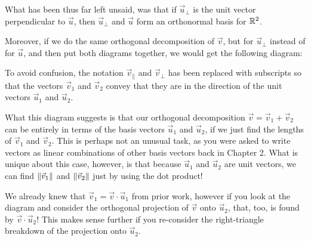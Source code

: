 \documentclass{ximera}
\begin{document}
What has been thus far left unsaid, was that if $\vec{u}_\perp$ is the unit vector perpendicular to $\vec{u}$, then $\vec{u}_\perp$ and $\vec{u}$ form an orthonormal basis for $\mathbb{R}^2$.

Moreover, if we do the same orthogonal decomposition of $\vec{v}$, but for $\vec{u}_\perp$ instead of for $\vec{u}$, and then put both diagrams together, we would get the following diagram:

\begin{center}
   
  \end{center}

  To avoid confusion, the notation $\vec{v}_\parallel$ and $\vec{v}_\perp$ has been replaced with subscripts so that the vectors $\vec{v}_1$ and $\vec{v}_2$ convey that they are in the direction of the unit vectors $\vec{u}_1$ and $\vec{u}_2$.

  What this diagram suggests is that our orthogonal decomposition $\vec{v}=\vec{v}_1+\vec{v}_2$ can be entirely in terms of the basis vectors $\vec{u}_1$ and $\vec{u}_2$, if we just find the lengths of $\vec{v}_1$ and $\vec{v}_2$. This is perhaps not an unusual task, as you were asked to write vectors as linear combinations of other basis vectors back in Chapter 2. What is unique about this case, however, is that because $\vec{u}_1$ and $\vec{u}_2$ are unit vectors, we can find $\left\|\vec{v}_1\right\|$ and $\left\|\vec{v}_2\right\|$ just by using the dot product!

  We already knew that $\vec{v}_1=\vec{v}\cdot\vec{u}_1$ from prior work, however if you look at the diagram and consider the orthogonal projection of $\vec{v}$ onto $\vec{u}_2$, that, too, is found by $\vec{v}\cdot\vec{u}_2$! This makes sense further if you re-consider the right-triangle breakdown of the projection onto $\vec{u}_2$.
\end{document}

